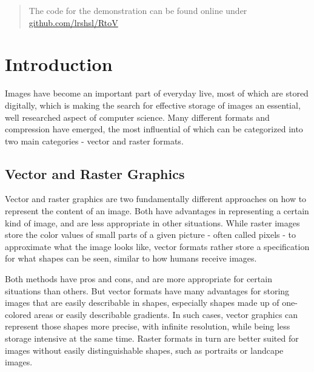 \documentclass[12pt, a4paper, titlepage]{report}
\begin{document}
\begin{titlepage}
\begin{abstract}
       \vspace{1cm}
       The code for the demonstration can be found online under \href{https://github.com/lrshsl/RtoV}{github.com/lrshsl/RtoV}
    \end{abstract}

\end{titlepage}



\tableofcontents





\chapter{Introduction}

Images have become an important part of everyday live, most of which are stored digitally, which is making the search for effective storage of images an essential, well researched aspect of computer science.
Many different formats and compression have emerged, the most influential of which can be categorized into two main categories - vector and raster formats.

\section{Vector and Raster Graphics}

Vector and raster graphics are two fundamentally different approaches on how to represent the content of an image. Both have advantages in representing a certain kind of image, and are less appropriate in other situations. While raster images store the color values of small parts of a given picture - often called pixels - to approximate what the image looks like, vector formats rather store a specification for what shapes can be seen, similar to how humans receive images.

Both methods have pros and cons, and are more appropriate for certain situations than others. But vector formats have many advantages for storing images that are easily describable in shapes, especially shapes made up of one-colored areas or easily describable gradients. In such cases, vector graphics can represent those shapes more precise, with infinite resolution, while being less storage intensive at the same time. Raster formats in turn are better suited for images without easily distinguishable shapes, such as portraits or landcape images.
\end{document}
